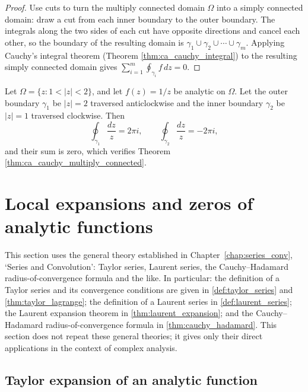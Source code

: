 \begin{proof}
Use cuts to turn the multiply connected domain $\Omega$ into a simply connected domain: draw a cut from each inner boundary to the outer boundary. The integrals along the two sides of each cut have opposite directions and cancel each other, so the boundary of the resulting domain is $\gamma_1 \cup \gamma_2 \cup \cdots \cup \gamma_m$. Applying Cauchy's integral theorem (Theorem \ref{thm:ca_cauchy_integral}) to the resulting simply connected domain gives $\sum_{i=1}^{m} \oint_{\gamma_i} f \, dz = 0$.
\end{proof}

\begin{example}\label{ex:ca_multiply_connected}
Let $\Omega = \{z : 1 < |z| < 2\}$, and let $f(z) = 1/z$ be analytic on $\Omega$. Let the outer boundary $\gamma_1$ be $|z| = 2$ traversed anticlockwise and the inner boundary $\gamma_2$ be $|z| = 1$ traversed clockwise. Then
\[
\oint_{\gamma_1} \frac{dz}{z} = 2\pi i, \qquad \oint_{\gamma_2} \frac{dz}{z} = -2\pi i,
\]
and their sum is zero, which verifies Theorem \ref{thm:ca_cauchy_multiply_connected}.
\end{example}

\section{Local expansions and zeros of analytic functions}

\begin{remark}\label{rem:ca_series_interface}
This section uses the general theory established in Chapter~\ref{chap:series_conv}, `Series and Convolution': Taylor series, Laurent series, the Cauchy--Hadamard radius-of-convergence formula and the like. In particular: the definition of a Taylor series and its convergence conditions are given in \cref{def:taylor_series} and \cref{thm:taylor_lagrange}; the definition of a Laurent series in \cref{def:laurent_series}; the Laurent expansion theorem in \cref{thm:laurent_expansion}; and the Cauchy--Hadamard radius-of-convergence formula in \cref{thm:cauchy_hadamard}. This section does not repeat these general theories; it gives only their direct applications in the context of complex analysis.
\end{remark}

\subsection{Taylor expansion of an analytic function}


